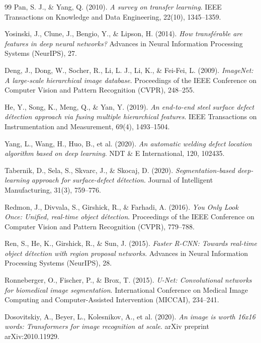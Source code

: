 \documentclass[12pt,a4paper,openany]{report}
\begin{document}
\begin{thebibliography}{99}
Pan, S. J., \& Yang, Q. (2010).
\textit{A survey on transfer learning}.
IEEE Transactions on Knowledge and Data Engineering, 22(10), 1345--1359.

Yosinski, J., Clune, J., Bengio, Y., \& Lipson, H. (2014).
\textit{How transférable are features in deep neural networks?}
Advances in Neural Information Processing Systems (NeurIPS), 27.

Deng, J., Dong, W., Socher, R., Li, L. J., Li, K., \& Fei-Fei, L. (2009).
\textit{ImageNet: A large-scale hierarchical image database}.
Proceedings of the IEEE Conference on Computer Vision and Pattern Recognition (CVPR), 248--255.

He, Y., Song, K., Meng, Q., \& Yan, Y. (2019).
\textit{An end-to-end steel surface defect détection approach via fusing multiple hierarchical features}.
IEEE Transactions on Instrumentation and Measurement, 69(4), 1493--1504.

Yang, L., Wang, H., Huo, B., et al. (2020).
\textit{An automatic welding defect location algorithm based on deep learning}.
NDT \& E International, 120, 102435.

Tabernik, D., Sela, S., Skvarc, J., \& Skocaj, D. (2020).
\textit{Segmentation-based deep-learning approach for surface-defect détection}.
Journal of Intelligent Manufacturing, 31(3), 759--776.

Redmon, J., Divvala, S., Girshick, R., \& Farhadi, A. (2016).
\textit{You Only Look Once: Unified, real-time object détection}.
Proceedings of the IEEE Conference on Computer Vision and Pattern Recognition (CVPR), 779--788.

Ren, S., He, K., Girshick, R., \& Sun, J. (2015).
\textit{Faster R-CNN: Towards real-time object détection with region proposal networks}.
Advances in Neural Information Processing Systems (NeurIPS), 28.

Ronneberger, O., Fischer, P., \& Brox, T. (2015).
\textit{U-Net: Convolutional networks for biomedical image segmentation}.
International Conference on Medical Image Computing and Computer-Assisted Intervention (MICCAI), 234--241.

Dosovitskiy, A., Beyer, L., Kolesnikov, A., et al. (2020).
\textit{An image is worth 16x16 words: Transformers for image recognition at scale}.
arXiv preprint arXiv:2010.11929.


\end{thebibliography}
\end{document}
